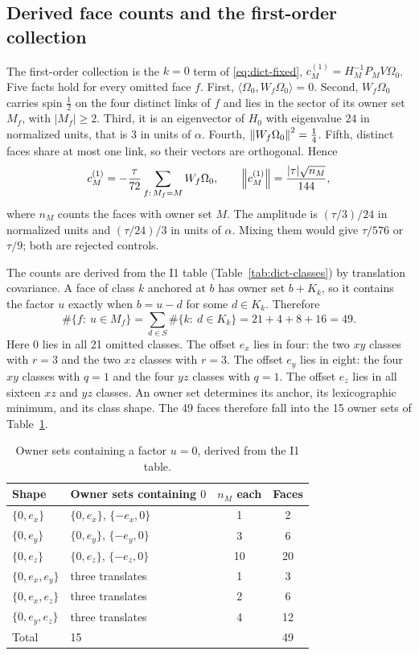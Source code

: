 \subsection{Derived face counts and the first-order collection}
\label{sec:av1-counts}
The first-order collection is the $k=0$ term of \eqref{eq:dict-fixed},
$c^{(1)}_M=H_M^{-1}P_MV\Omega_0$. Five facts hold for every omitted face $f$.
First, $\langle\Omega_0,W_f\Omega_0\rangle=0$. Second, $W_f\Omega_0$ carries
spin $\tfrac12$ on the four distinct links of $f$ and lies in the sector of
its owner set $M_f$, with $|M_f|\ge2$. Third, it is an eigenvector of $H_0$
with eigenvalue $24$ in normalized units, that is $3$ in units of $\alpha$.
Fourth, $\left\lVert W_f\Omega_0\right\rVert^2=\tfrac14$. Fifth, distinct faces share at most
one link, so their vectors are orthogonal. Hence
\begin{equation}
 c^{(1)}_M=-\frac{\tau}{72}\sum_{f:\,M_f=M}W_f\Omega_0,\qquad
 \left\lVert c^{(1)}_M\right\rVert=\frac{|\tau|\sqrt{n_M}}{144},
 \label{eq:av1-first}
\end{equation}
where $n_M$ counts the faces with owner set $M$. The amplitude is
$(\tau/3)/24$ in normalized units and $(\tau/24)/3$ in units of $\alpha$.
Mixing them would give $\tau/576$ or $\tau/9$; both are rejected controls.

The counts are derived from the I1 table (Table~\ref{tab:dict-classes}) by
translation covariance. A face of class $k$ anchored at $b$ has owner set
$b+K_k$, so it contains the factor $u$ exactly when $b=u-d$ for some
$d\in K_k$. Therefore
\begin{equation}
 \#\{f:\ u\in M_f\}=\sum_{d\in S}\#\{k:\ d\in K_k\}=21+4+8+16=49 .
 \label{eq:av1-49}
\end{equation}
Here $0$ lies in all 21 omitted classes. The offset $e_x$ lies in four: the
two $xy$ classes with $r=3$ and the two $xz$ classes with $r=3$. The offset
$e_y$ lies in eight: the four $xy$ classes with $q=1$ and the four $yz$
classes with $q=1$. The offset $e_z$ lies in all sixteen $xz$ and $yz$
classes. An owner set determines its anchor, its lexicographic minimum, and
its class shape. The 49 faces therefore fall into the 15 owner sets of
Table~\ref{tab:av1-owners}.

\begin{table}[htbp]
\centering\small
\caption{Owner sets containing a factor $u=0$, derived from the I1 table.}
\label{tab:av1-owners}
\begin{tabular}{llcc}
\toprule
Shape & Owner sets containing $0$ & $n_M$ each & Faces\\
\midrule
$\{0,e_x\}$ & $\{0,e_x\}$, $\{-e_x,0\}$ & 1 & 2\\
$\{0,e_y\}$ & $\{0,e_y\}$, $\{-e_y,0\}$ & 3 & 6\\
$\{0,e_z\}$ & $\{0,e_z\}$, $\{-e_z,0\}$ & 10 & 20\\
$\{0,e_x,e_y\}$ & three translates & 1 & 3\\
$\{0,e_x,e_z\}$ & three translates & 2 & 6\\
$\{0,e_y,e_z\}$ & three translates & 4 & 12\\
\midrule
Total & 15 & & 49\\
\bottomrule
\end{tabular}
\end{table}

